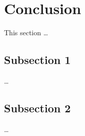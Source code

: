 

\section{Conclusion}

    This section \ldots

    \subsection{Subsection 1}

        \ldots

    \subsection{Subsection 2}

        \ldots
